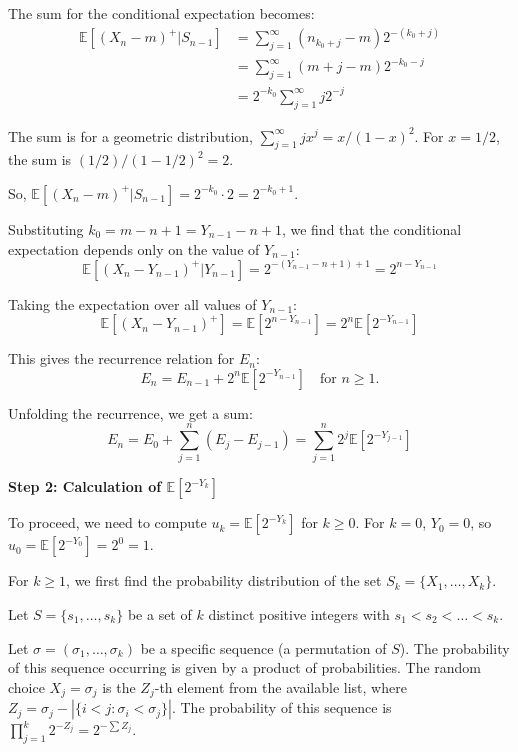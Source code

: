 \documentclass[12pt,a4paper]{article}
\theoremstyle{definition}
\begin{document}
        The sum for the conditional expectation becomes:
        \begin{align}
            \mathbb{E}[(X_n - m)^+ | S_{n-1}] &= \sum_{j=1}^{\infty} (n_{k_0+j} - m) 2^{-(k_0+j)} \\
            &= \sum_{j=1}^{\infty} (m+j - m) 2^{-k_0-j} \\
            &= 2^{-k_0} \sum_{j=1}^{\infty} j 2^{-j}
        \end{align}

        The sum is for a geometric distribution, $\sum_{j=1}^{\infty} jx^j = x/(1-x)^2$. For $x=1/2$, the sum is $(1/2)/(1-1/2)^2 = 2$.

        So, $\mathbb{E}[(X_n - m)^+ | S_{n-1}] = 2^{-k_0} \cdot 2 = 2^{-k_0+1}$.

        Substituting $k_0 = m - n + 1 = Y_{n-1} - n + 1$, we find that the conditional expectation depends only on the value of $Y_{n-1}$:
        \[ \mathbb{E}[(X_n - Y_{n-1})^+ | Y_{n-1}] = 2^{-(Y_{n-1}-n+1)+1} = 2^{n-Y_{n-1}} \]

        Taking the expectation over all values of $Y_{n-1}$:
        \[ \mathbb{E}[(X_n - Y_{n-1})^+] = \mathbb{E}[2^{n-Y_{n-1}}] = 2^n \mathbb{E}[2^{-Y_{n-1}}] \]

        This gives the recurrence relation for $E_n$:
        \[ E_n = E_{n-1} + 2^n \mathbb{E}[2^{-Y_{n-1}}] \quad \text{for } n \geq 1. \]

        Unfolding the recurrence, we get a sum:
        \[ E_n = E_0 + \sum_{j=1}^n (E_j - E_{j-1}) = \sum_{j=1}^n 2^j \mathbb{E}[2^{-Y_{j-1}}] \]

        \textbf{Step 2: Calculation of $\mathbb{E}[2^{-Y_k}]$}

        To proceed, we need to compute $u_k = \mathbb{E}[2^{-Y_k}]$ for $k \geq 0$. For $k=0$, $Y_0=0$, so $u_0 = \mathbb{E}[2^{-Y_0}] = 2^0 = 1$.

        For $k \geq 1$, we first find the probability distribution of the set $S_k = \{X_1, \dots, X_k\}$.

        Let $S = \{s_1, \dots, s_k\}$ be a set of $k$ distinct positive integers with $s_1 < s_2 < \dots < s_k$.

        Let $\sigma = (\sigma_1, \dots, \sigma_k)$ be a specific sequence (a permutation of $S$). The probability of this sequence occurring is given by a product of probabilities. The random choice $X_j=\sigma_j$ is the $Z_j$-th element from the available list, where $Z_j = \sigma_j - |\{i<j : \sigma_i < \sigma_j\}|$. The probability of this sequence is $\prod_{j=1}^k 2^{-Z_j} = 2^{-\sum Z_j}$.
\end{document}

